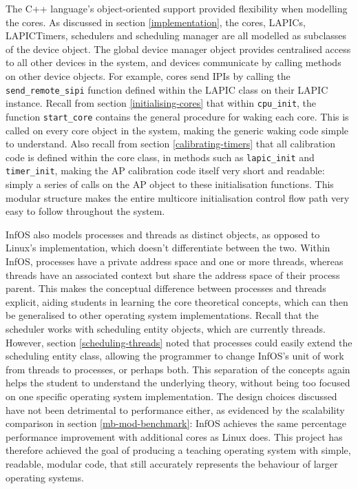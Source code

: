 \documentclass[bsc,frontabs,singlespacing,parskip,deptreport]{infthesis}
\begin{document}
The C++ language's object-oriented support provided flexibility when modelling the cores. As discussed in section \ref{implementation}, the cores, LAPICs, LAPICTimers, schedulers and scheduling manager are all modelled as subclasses of the device object. The global device manager object provides centralised access to all other devices in the system, and devices communicate by calling methods on other device objects. For example, cores send IPIs by calling the \verb|send_remote_sipi| function defined within the LAPIC class on their LAPIC instance. Recall from section \ref{initialising-cores} that within \verb|cpu_init|, the function \verb|start_core| contains the general procedure for waking each core. This is called on every core object in the system, making the generic waking code simple to understand. Also recall from section \ref{calibrating-timers} that all calibration code is defined within the core class, in methods such as \verb|lapic_init| and \verb|timer_init|, making the AP calibration code itself very short and readable: simply a series of calls on the AP object to these initialisation functions. This modular structure makes the entire multicore initialisation control flow path very easy to follow throughout the system.

InfOS also models processes and threads as distinct objects, as opposed to Linux's implementation, which doesn't differentiate between the two. Within InfOS, processes have a private address space and one or more threads, whereas threads have an associated context but share the address space of their process parent. This makes the conceptual difference between processes and threads explicit, aiding students in learning the core theoretical concepts, which can then be generalised to other operating system implementations. Recall that the scheduler works with scheduling entity objects, which are currently threads. However, section \ref{scheduling-threads} noted that processes could easily extend the scheduling entity class, allowing the programmer to change InfOS's unit of work from threads to processes, or perhaps both. This separation of the concepts again helps the student to understand the underlying theory, without being too focused on one specific operating system implementation. The design choices discussed have not been detrimental to performance either, as evidenced by the scalability comparison in section \ref{mb-mod-benchmark}: InfOS achieves the same percentage performance improvement with additional cores as Linux does. This project has therefore achieved the goal of producing a teaching operating system with simple, readable, modular code, that still accurately represents the behaviour of larger operating systems.
\end{document}
